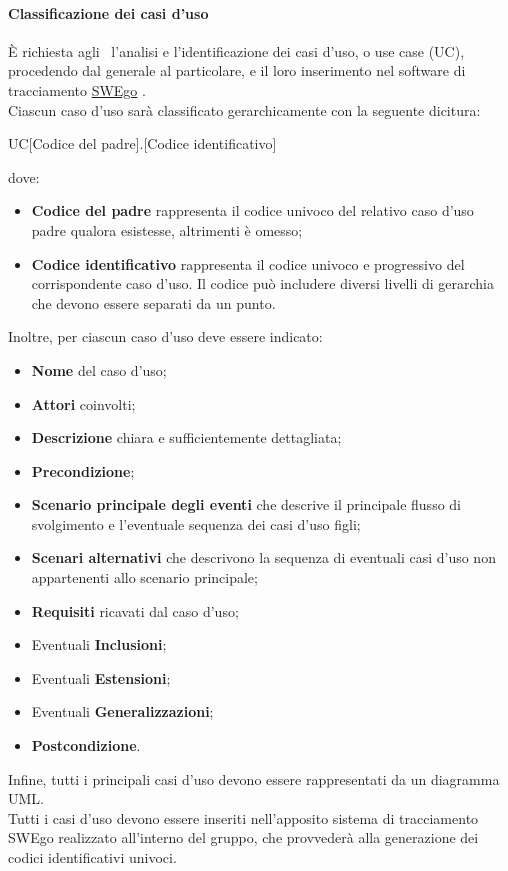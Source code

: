 \documentclass[../NormeDiProgetto.tex]{subfiles}
\begin{document}
			\paragraph{Classificazione dei casi d'uso\\}
				È richiesta agli \analisti\ l'analisi e l'identificazione dei casi d'uso, o use case (UC), procedendo dal generale al particolare,
				e il loro inserimento nel software di tracciamento \hyperlink{SWEgo}{SWEgo} .\\
				Ciascun caso d'uso sarà classificato gerarchicamente con la seguente dicitura:
				\begin{center}
					UC[Codice del padre].[Codice identificativo]
				\end{center}
				dove:
				\begin{itemize}
					\item \textbf{Codice del padre} rappresenta il codice univoco
					del relativo caso d'uso padre qualora esistesse, altrimenti è omesso;
					\item \textbf{Codice identificativo} rappresenta il codice
					univoco e progressivo del corrispondente caso d'uso. Il codice
					può includere diversi livelli di gerarchia che devono essere
					separati da un punto.
				\end{itemize}
				Inoltre, per ciascun caso d'uso deve essere indicato:
				\begin{itemize}
					\item \textbf{Nome} del caso d'uso;
					\item \textbf{Attori} coinvolti;
					\item \textbf{Descrizione} chiara e sufficientemente
					dettagliata;
					\item \textbf{Precondizione};
					\item \textbf{Scenario principale degli eventi} che descrive il principale flusso di svolgimento e l'eventuale sequenza dei casi d'uso figli;
					\item \textbf{Scenari alternativi} che descrivono la sequenza
					di eventuali casi d'uso non appartenenti allo scenario
					principale;
					\item \textbf{Requisiti} ricavati dal caso d'uso;
					\item Eventuali \textbf{Inclusioni};
					\item Eventuali \textbf{Estensioni};
					\item Eventuali \textbf{Generalizzazioni};
					\item \textbf{Postcondizione}.
				\end{itemize}
				Infine, tutti i principali casi d'uso devono essere rappresentati da un diagramma UML.\\
				Tutti i casi d'uso devono essere inseriti nell'apposito sistema di tracciamento SWEgo realizzato all'interno del gruppo, che provvederà alla generazione
				dei codici identificativi univoci.
\end{document}
